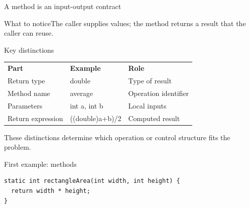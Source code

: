 \documentclass[10pt,aspectratio=169]{beamer}
\begin{document}
\begin{frame}[fragile,t]{A method is an input-output contract}
\begin{center}\end{center}
\begin{block}{What to notice}The caller supplies values; the method returns a result that the caller can reuse.\end{block}
\end{frame}
\begin{frame}[fragile,t]{Key distinctions}
\small\renewcommand{\arraystretch}{1.5}
\begin{tabularx}{\textwidth}{>{\raggedright\arraybackslash}X>{\raggedright\arraybackslash}X>{\raggedright\arraybackslash}X}
\rowcolor{navy}
\color{white}\bfseries Part & \color{white}\bfseries Example & \color{white}\bfseries Role\\
Return type & double & Type of result\\
Method name & average & Operation identifier\\
Parameters & int a, int b & Local inputs\\
Return expression & ((double)a+b)/2 & Computed result\\
\end{tabularx}
\vspace{3mm}\footnotesize These distinctions determine which operation or control structure fits the problem.
\end{frame}

\begin{frame}[fragile,t]{First example: methods}
\begin{lstlisting}
static int rectangleArea(int width, int height) {
  return width * height;
}
\end{lstlisting}
\end{frame}
\end{document}

